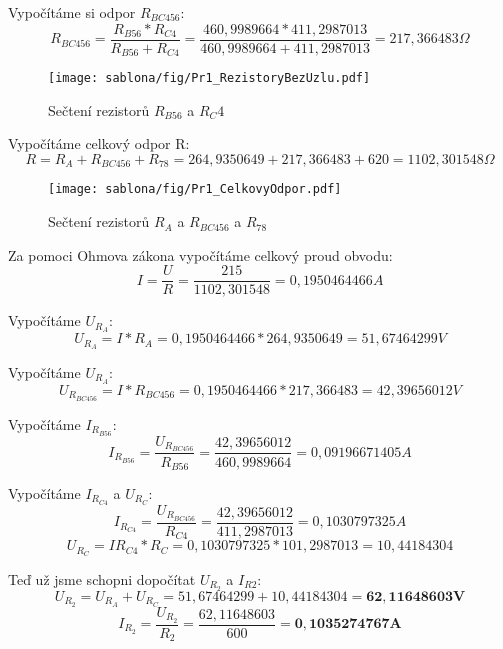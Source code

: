 Vypočítáme si odpor $R_{BC456}$:
$$R_{BC456} = \frac{R_{B56}*R_{C4}}{R_{B56}+R_{C4}} = \frac{460,9989664*411,2987013}{460,9989664+411,2987013} = 217,366483\Omega$$
    \begin{figure}[htb]
    \centering
    \texttt{[image: sablona/fig/Pr1\_RezistoryBezUzlu.pdf]} \\
    \caption{Sečtení rezistorů $R_{B56}$ a $R_C4$}
    \end{figure}

Vypočítáme celkový odpor R:
$$R = R_A + R_{BC456} + R_{78} = 264,9350649 + 217,366483 + 620 = 1102,301548\Omega$$
    \begin{figure}[htb]
    \centering
    \texttt{[image: sablona/fig/Pr1\_CelkovyOdpor.pdf]} \\
    \caption{Sečtení rezistorů $R_A$ a $R_{BC456}$ a $R_{78}$}
    \end{figure}

Za pomoci Ohmova zákona vypočítáme celkový proud obvodu:
$$I = \frac{U}{R} = \frac{215}{1102,301548} = 0,1950464466A$$
\newline

Vypočítáme $U_{R_A}$:
$$U_{R_A} = I * R_A = 0,1950464466 * 264,9350649 = 51,67464299V$$
\newline

Vypočítáme $U_{R_A}$:
$$U_{R_{BC456}} = I * R_{BC456} = 0,1950464466 * 217,366483 = 42,39656012V$$
\newline

Vypočítáme $I_{R_{B56}}$:
$$I_{R_{B56}} = \frac{U_{R_{BC456}}}{R_{B56}} = \frac{42,39656012}{460,9989664} = 0,09196671405A$$
\newline

Vypočítáme $I_{R_{C4}}$ a $U_{R_C}$:
$$I_{R_{C4}} = \frac{U_{R_{BC456}}}{R_{C4}} = \frac{42,39656012}{411,2987013} = 0,1030797325A$$
$$U_{R_C} = I{R_{C4}} * R_C = 0,1030797325 * 101,2987013 = 10,44184304$$
\newline

Teď už jsme schopni dopočítat $U_{R_2}$ a $I_{R2}$:
$$U_{R_2} = U_{R_A} + U_{R_C} = 51,67464299 + 10,44184304 = \mathbf{62,11648603V}$$
$$I_{R_2} = \frac{U_{R_2}}{R_2} = \frac{62,11648603}{600} = \mathbf{0,1035274767A}$$
